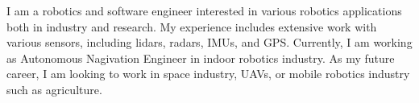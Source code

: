 

\begin{cvparagraph}

I am a robotics and software engineer interested in various robotics applications both in industry and research. My experience includes extensive work with various sensors, including lidars, radars, IMUs, and GPS. Currently, I am working as Autonomous Nagivation Engineer in indoor robotics 
industry. As my future career, I am looking to work in space
industry, UAVs, or mobile robotics industry such as agriculture.
\end{cvparagraph}
